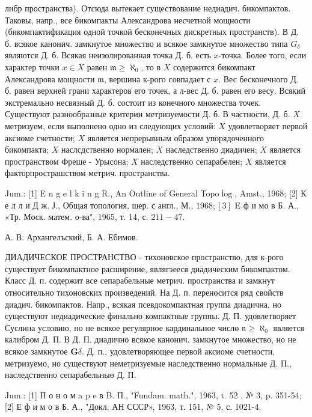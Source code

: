 \documentclass[10pt]{article}
\begin{document}
либр пространства). Отсюда вытекает существование недиадич. бикомпактов. Таковы, напр., все бикомпакты Александрова несчетной мощности (бикомпактификация одной точкой бесконечных дискретных пространств). В Д. б. всякое канонич. замкнутое множество и всякое замкнутое множество типа $G_{\delta}$ являются Д. б. Всякая неизолированная точка Д. б. есть $x$-точка. Более того, если характер точки $x \in X$ равен $\mathfrak{m} \geqslant \aleph_{0}$, то в $X$ содержится бикомпакт Александрова мощности $\mathfrak{m}$, вершина к-рого совпадает с $x$. Вес бесконечного Д. б. равен верхней грани характеров его точек, а л-вес Д. б. равен его весу. Всякий экстремально несвязный Д. б. состоит из конечного множества точек. Существуют разнообразные критерии метризуемости Д. б. В частности, Д. б. $X$ метризуем, если выполнено одно из следующих условий: $X$ удовлетворяет первой аксиоме счетности; $X$ является непрерывным образом упорядоченного бикомпакта; $X$ наслсдственно нормален; $X$ наследственно диадичен; $X$ является пространством Фреше - Урысона; $X$ наследственно сепарабелен; $X$ является факторпрострашством метрич. пространства.



Jum.: [1] E n g e l k i n g R., An Outline of General Topo$\log$, Amst., 1968; [2] К е л л и Д ж. Ј., Общая топология, шер. с англ., М., $1968 ;[3]$ E ф и мо в Б. А., «Тр. Моск. матем. о-ва", 1965, т. 14, с. $211-47$.



А. В. Архангелъский, Б. А. Ебимов.



ДИАДИЧЕСКОЕ ПРОСТРАНСТВО - тихоновское пространство, для к-рого существует бикомпактное расширение, являгэееся диадическим бикомпактом. Класс Д. п. содержит все сепарабельные метрич. пространства и замкнут относительно тихоновских произведений. На Д. п. переносится ряд свойств диадич. бикомпактов. Напр., всякая псевдокомпактная группа диадична, но существуют недиадические финально компактные группы. Д. П. удовлетворяет Суслина условию, но не всякое регулярное кардинальное число $\mathfrak{n} \geqslant \aleph_{0}$ является калибром Д. П. В Д. П. диадично всякое канонич. замкнутое множество, но не всякое замкнутое $\boldsymbol{G} \delta$. Д. п., удовлетворяющее первой аксиоме счетности, метризуемо, но существуют неметризуемые наследственно нормальные Д. П., наследственно сепарабельныө Д. П.



Jum.: [1] П о н о м a p e в B. П., "Fundam. math.", 1963, t. 52 , № 3, p. 351-54; [2] Е ф и м о в Б. А., "Докл. АН СССР», 1963, т. 151, № 5, с. 1021-4.
\end{document}
